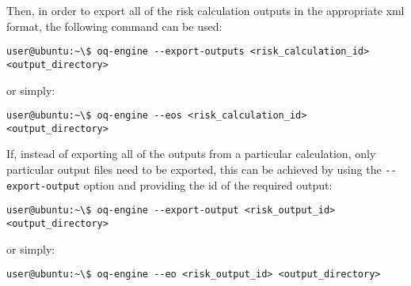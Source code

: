 Then, in order to export all of the risk calculation outputs in the
appropriate xml format, the following command can be used:

\begin{verbatim}
user@ubuntu:~\$ oq-engine --export-outputs <risk_calculation_id> <output_directory>
\end{verbatim}

or simply:

\begin{verbatim}
user@ubuntu:~\$ oq-engine --eos <risk_calculation_id> <output_directory>
\end{verbatim}

If, instead of exporting all of the outputs from a particular calculation,
only particular output files need to be exported, this can be achieved by
using the \Verb+--export-output+ option and providing the id of the required
output:

\begin{verbatim}
user@ubuntu:~\$ oq-engine --export-output <risk_output_id> <output_directory>
\end{verbatim}

or simply:

\begin{verbatim}
user@ubuntu:~\$ oq-engine --eo <risk_output_id> <output_directory>
\end{verbatim}